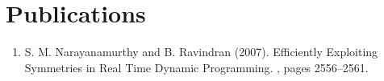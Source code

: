 \documentclass[MTech]{iitmdiss}
\begin{document}
\chapter*{Publications}
\vspace{-0.3cm}

\begin{enumerate}
\item S. M. Narayanamurthy and B. Ravindran (2007). \newblock
  Efficiently Exploiting Symmetries in Real Time Dynamic Programming. , pages 2556--2561.
\end{enumerate}


\pagebreak
\begin{singlespace}
  \begin{small}
	
  \end{small}
\end{singlespace}

\end{document}
